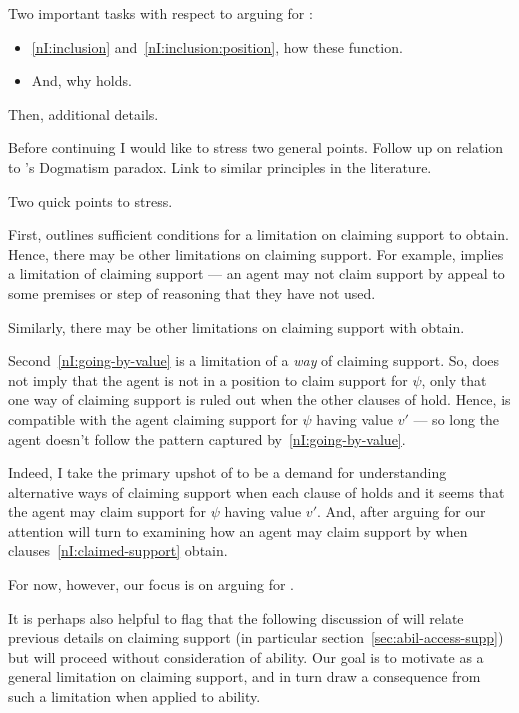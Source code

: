 \begin{note}[Task]
  Two important tasks with respect to arguing for \nI{}:

  \begin{itemize}
  \item \ref{nI:inclusion} and~\ref{nI:inclusion:position}, how these function.
  \item And, why \nI{} holds.
  \end{itemize}

  Then, additional details.
\end{note}

\begin{note}
  Before continuing I would like to stress two general points.
  Follow up on relation to \citeauthor{Kripke:2011wv}'s Dogmatism paradox.
  Link to similar principles in the literature.
\end{note}

\begin{note}
  Two quick points to stress.
\end{note}

\begin{note}
  First, \nI{} outlines sufficient conditions for a limitation on claiming support to obtain.
  Hence, there may be other limitations on claiming support.
  For example, \ESU{} implies a limitation of claiming support --- an agent may not claim support by appeal to some premises or step of reasoning that they have not used.

  Similarly, there may be other limitations on claiming support with obtain.
\end{note}

\begin{note}
  Second~\ref{nI:going-by-value} is a limitation of a \emph{way} of claiming support.
  So, \nI{} does not imply that the agent is not in a position to claim support for \(\psi\), only that one way of claiming support is ruled out when the other clauses of \nI{} hold.
  Hence, \nI{} is compatible with the agent claiming support for \(\psi\) having value \(v'\) --- so long the agent doesn't follow the pattern captured by~\ref{nI:going-by-value}.

  Indeed, I take the primary upshot of \nI{} to be a demand for understanding alternative ways of claiming support when each clause of \nI{} holds and it seems that the agent may claim support for \(\psi\) having value \(v'\).
  And, after arguing for \nI{} our attention will turn to examining how an agent may claim support by \EAS{} when clauses~\ref{nI:claimed-support} obtain.

  For now, however, our focus is on arguing for \nI{}.

  It is perhaps also helpful to flag that the following discussion of \nI{} will relate previous details on claiming support (in particular section~\ref{sec:abil-access-supp}) but will proceed without consideration of ability.
  Our goal is to motivate \nI{} as a general limitation on claiming support, and in turn draw a consequence from such a limitation when applied to ability.
\end{note}

